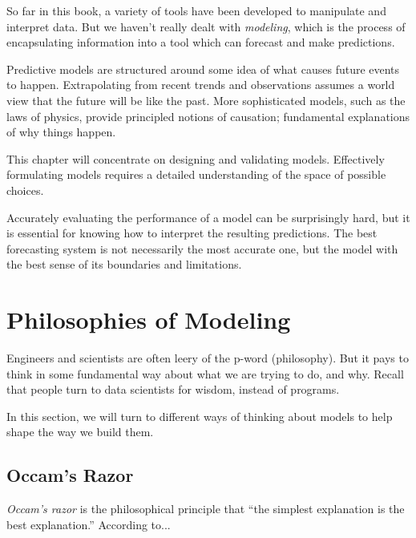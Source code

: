 \documentclass[10pt]{article}
\begin{document}
So far in this book, a variety of tools have been developed to manipulate and interpret data. But we haven't really dealt with \textit{modeling}, which is the process of encapsulating information into a tool which can forecast and make predictions.

Predictive models are structured around some idea of what causes future events to happen. Extrapolating from recent trends and observations assumes a world view that the future will be like the past. More sophisticated models, such as the laws of physics, provide principled notions of causation; fundamental explanations of why things happen.

This chapter will concentrate on designing and validating models. Effectively formulating models requires a detailed understanding of the space of possible choices.

Accurately evaluating the performance of a model can be surprisingly hard, but it is essential for knowing how to interpret the resulting predictions. The best forecasting system is not necessarily the most accurate one, but the model with the best sense of its boundaries and limitations.

\section{Philosophies of Modeling}
Engineers and scientists are often leery of the p-word (philosophy). But it pays to think in some fundamental way about what we are trying to do, and why. Recall that people turn to data scientists for wisdom, instead of programs.

In this section, we will turn to different ways of thinking about models to help shape the way we build them.

\subsection{Occam's Razor}
\textit{Occam’s razor} is the philosophical principle that “the simplest explanation is the best explanation.” According to...
\end{document}
